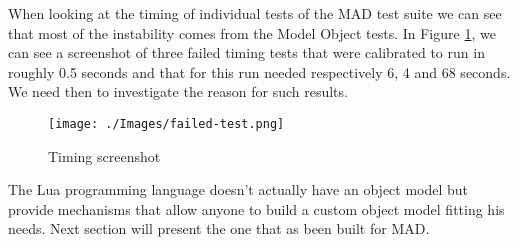 
When looking at the timing of individual tests of the MAD test suite we can see
that most of the instability comes from the Model Object tests. In Figure
\ref{fig:failed-test}, we can see a screenshot of three failed timing tests that
were calibrated to run in roughly 0.5 seconds and that for this run needed respectively
6, 4 and 68 seconds. We need then to investigate the reason for such results.

\begin{figure}[H]
    \centering
	\texttt{[image: ./Images/failed-test.png]}
    \caption{Timing screenshot}
    \label{fig:failed-test}
\end{figure}

The Lua programming language doesn't actually have an object model but provide
mechanisms that allow anyone to build a custom object model fitting his needs.
Next section will present the one that as been built for MAD.
